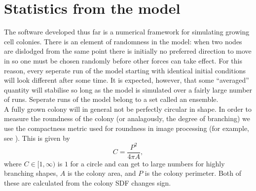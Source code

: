 \section{Statistics from the model}
The software developed thus far is a numerical framework for simulating growing cell colonies.
There is an element of randomness in the model: when two nodes are dislodged from the 
same point there is initially no preferred direction to move in so one must be chosen randomly
before other forces can take effect. For this reason, every seperate run of the model 
starting with identical initial conditions will look different after some time. 
It is expected, however, that some ``averaged''
quantity will stabilise so long as the model is simulated over a fairly large number of runs.
Seperate runs of the model belong to a set called an ensemble.
\\

A fully grown colony will in general not be perfectly circular in shape.
In order to measure the roundness of the colony (or analagously, the degree of branching) 
we use the compactness metric used for 
 roundness in image processing (for example, see \cite{li2024off}). This is given by
\begin{equation}
  C = \frac{P^2}{4 \pi A},
\end{equation}
where $C \in [1, \infty)$ is $1$ for a circle and can get to large numbers for 
highly branching shapes, $A$ is the colony area, and $P$ is the colony perimeter. 
Both of these are calculated from the colony SDF changes sign. 
\\

